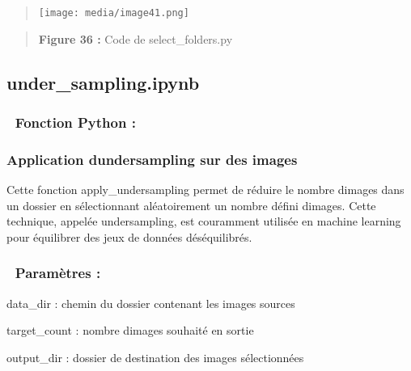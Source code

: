 \begin{quote}
\texttt{[image: media/image41.png]}
\end{quote}

\begin{quote}
\textbf{Figure 36 : }Code de select\_folders.py
\end{quote}

\subsection[under\_sampling.ipynb]{\texorpdfstring{\protect\hypertarget{anchor-59}{}{}under\_sampling.ipynb}{under\_sampling.ipynb}}\label{under_sampling.ipynb}

\subsubsection[🔽\textbf{ Fonction Python
:}]{\texorpdfstring{\protect\hypertarget{anchor-60}{}{}🔽\textbf{
Fonction Python :}}{🔽 Fonction Python :}}\label{fonction-python}

\subsubsection[Application d\textquotesingle undersampling sur des
images]{\texorpdfstring{\protect\hypertarget{anchor-61}{}{}Application
d\textquotesingle undersampling sur des
images}{Application d\textquotesingle undersampling sur des images}}\label{application-dundersampling-sur-des-images}

Cette fonction apply\_undersampling permet de réduire le nombre
d\textquotesingle images dans un dossier en sélectionnant aléatoirement
un nombre défini d\textquotesingle images. Cette technique, appelée
undersampling, est couramment utilisée en machine learning pour
équilibrer des jeux de données déséquilibrés.

\subsubsection[🔧\textbf{ Paramètres
:}]{\texorpdfstring{\protect\hypertarget{anchor-62}{}{}🔧\textbf{
Paramètres :}}{🔧 Paramètres :}}\label{paramuxe8tres}

data\_dir : chemin du dossier contenant les images sources

target\_count : nombre d\textquotesingle images souhaité en sortie

output\_dir : dossier de destination des images sélectionnées

